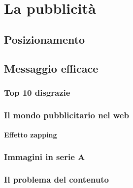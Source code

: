 
\chapter{La pubblicità}

	\section{Posizionamento}
	
	\section{Messaggio efficace}
		
		\subsection{Top 10 disgrazie}
		
		\subsection{Il mondo pubblicitario nel web}
		
			\subsubsection{Effetto zapping}
			
			
		\subsection{Immagini in serie A}
		
		\subsection{Il problema del contenuto}